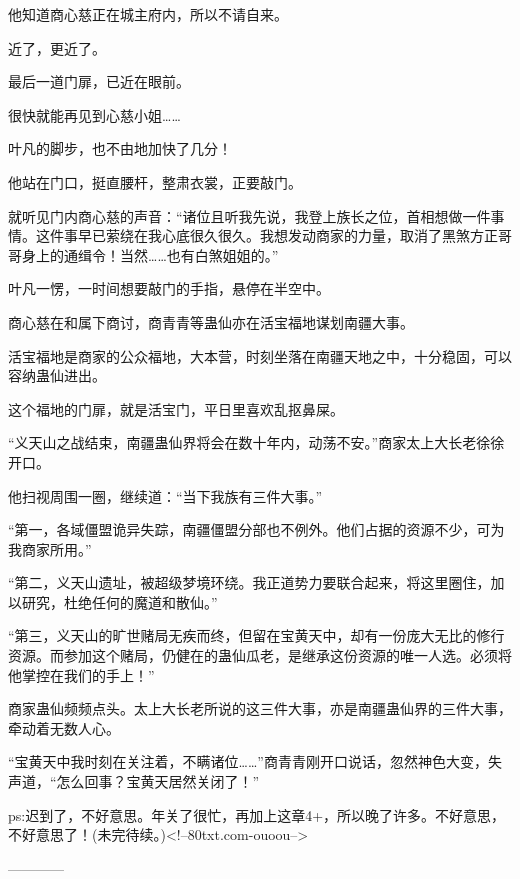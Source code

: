 \begin{this_body}
他知道商心慈正在城主府内，所以不请自来。

近了，更近了。

最后一道门扉，已近在眼前。

很快就能再见到心慈小姐……

叶凡的脚步，也不由地加快了几分！

他站在门口，挺直腰杆，整肃衣裳，正要敲门。

就听见门内商心慈的声音：“诸位且听我先说，我登上族长之位，首相想做一件事情。这件事早已萦绕在我心底很久很久。我想发动商家的力量，取消了黑煞方正哥哥身上的通缉令！当然……也有白煞姐姐的。”

叶凡一愣，一时间想要敲门的手指，悬停在半空中。

商心慈在和属下商讨，商青青等蛊仙亦在活宝福地谋划南疆大事。

活宝福地是商家的公众福地，大本营，时刻坐落在南疆天地之中，十分稳固，可以容纳蛊仙进出。

这个福地的门扉，就是活宝门，平日里喜欢乱抠鼻屎。

“义天山之战结束，南疆蛊仙界将会在数十年内，动荡不安。”商家太上大长老徐徐开口。

他扫视周围一圈，继续道：“当下我族有三件大事。”

“第一，各域僵盟诡异失踪，南疆僵盟分部也不例外。他们占据的资源不少，可为我商家所用。”

“第二，义天山遗址，被超级梦境环绕。我正道势力要联合起来，将这里圈住，加以研究，杜绝任何的魔道和散仙。”

“第三，义天山的旷世赌局无疾而终，但留在宝黄天中，却有一份庞大无比的修行资源。而参加这个赌局，仍健在的蛊仙瓜老，是继承这份资源的唯一人选。必须将他掌控在我们的手上！”

商家蛊仙频频点头。太上大长老所说的这三件大事，亦是南疆蛊仙界的三件大事，牵动着无数人心。

“宝黄天中我时刻在关注着，不瞒诸位……”商青青刚开口说话，忽然神色大变，失声道，“怎么回事？宝黄天居然关闭了！”

ps:迟到了，不好意思。年关了很忙，再加上这章4+，所以晚了许多。不好意思，不好意思了！(未完待续。)<!--80txt.com-ouoou-->

------------

\end{this_body}

